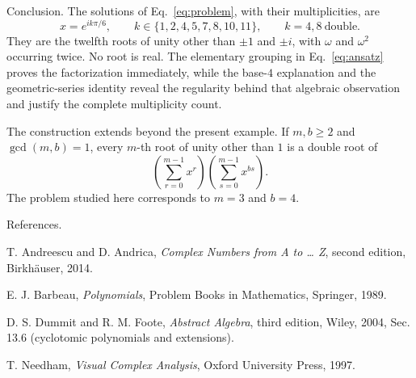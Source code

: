 \documentclass[11pt,aspectratio=169]{beamer}
\newcommand{\slidebody}{%
  \fontsize{10.6}{12.8}\selectfont\justifying%
  \setlength{\parskip}{4.2pt}%
  \setlength{\abovedisplayskip}{4pt}%
  \setlength{\belowdisplayskip}{4pt}%
  \setlength{\abovedisplayshortskip}{2pt}%
  \setlength{\belowdisplayshortskip}{2.5pt}%
}
\newcommand{\tightbody}{\slidebody\fontsize{10.2}{12.3}\selectfont\setlength{\parskip}{3pt}}
\begin{document}
\begin{frame}[t]{Conclusion.}
\tightbody
The solutions of Eq.~\eqref{eq:problem}, with their multiplicities, are
\begin{equation}\label{eq:final-roots}
 x=e^{ik\pi/6},\qquad
 k\in\{1,2,4,5,7,8,10,11\},
 \qquad k=4,8\ \text{double}.
\end{equation}
They are the twelfth roots of unity other than $\pm1$ and $\pm i$, with $\omega$ and $\omega^2$ occurring twice. No root is real. The elementary grouping in Eq.~\eqref{eq:ansatz} proves the factorization immediately, while the base-$4$ explanation and the geometric-series identity reveal the regularity behind that algebraic observation and justify the complete multiplicity count.

The construction extends beyond the present example. If $m,b\ge 2$ and $\gcd(m,b)=1$, every $m$-th root of unity other than $1$ is a double root of
\begin{equation}\label{eq:generalization}
 \left(\sum_{r=0}^{m-1}x^r\right)
 \left(\sum_{s=0}^{m-1}x^{bs}\right).
\end{equation}
The problem studied here corresponds to $m=3$ and $b=4$.
\end{frame}

\begin{frame}[t]{References.}
\slidebody
\begingroup
\fontsize{10.6}{14.2}\selectfont
\begin{list}{\textbullet}{%
\setlength{\leftmargin}{5.5mm}%
\setlength{\labelwidth}{2.5mm}%
\setlength{\labelsep}{2.1mm}%
\setlength{\itemindent}{0pt}%
\setlength{\itemsep}{3.8mm}%
\setlength{\parsep}{0pt}%
}
\item \justifying T. Andreescu and D. Andrica, \textit{Complex Numbers from A to \ldots{} Z}, second edition, Birkhäuser, 2014.
\item \justifying E. J. Barbeau, \textit{Polynomials}, Problem Books in Mathematics, Springer, 1989.
\item \justifying D. S. Dummit and R. M. Foote, \textit{Abstract Algebra}, third edition, Wiley, 2004, Sec. 13.6 (cyclotomic polynomials and extensions).
\item \justifying T. Needham, \textit{Visual Complex Analysis}, Oxford University Press, 1997.
\end{list}
\endgroup
\end{frame}
\end{document}
